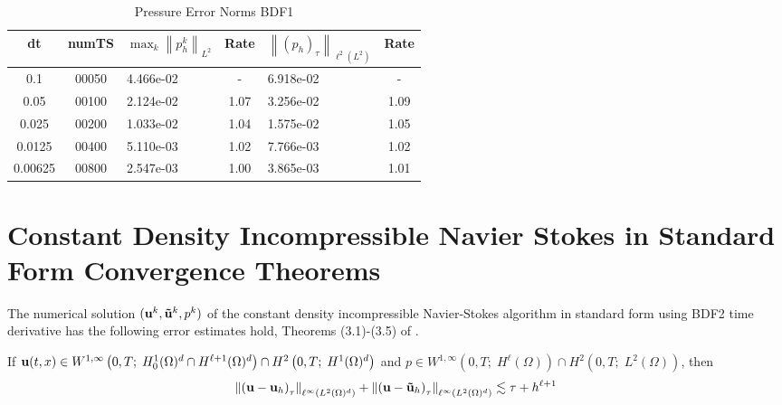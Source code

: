 \documentclass[letterpaper]{erdc}
\begin{document}
\begin{table}[h!]
  \begin{center}
    \caption{Pressure Error Norms BDF1}
    \begin{tabular}{c|c|l|c|l|c}
      dt & numTS &  $\displaystyle\max_{k} \left\|p^{k}_{h}\right\|_{L^2}$ &  Rate  &  $\left\|\left(p_h\right)_{\tau}\right\|_{\ell^2(L^2)}$  &  Rate\\
      \hline
      0.1     & 00050 & 4.466e-02 &   -  & 6.918e-02 &   - \\
      0.05    & 00100 & 2.124e-02 & 1.07 & 3.256e-02 & 1.09\\
      0.025   & 00200 & 1.033e-02 & 1.04 & 1.575e-02 & 1.05\\
      0.0125  & 00400 & 5.110e-03 & 1.02 & 7.766e-03 & 1.02\\
      0.00625 & 00800 & 2.547e-03 & 1.00 & 3.865e-03 & 1.01
    \end{tabular}
  \end{center}
\end{table}





\section{Constant Density Incompressible Navier Stokes in Standard Form Convergence Theorems}

The numerical solution $(\textbf{u}^k, \mathbf{\tilde{u}}^k,p^k)$ of the constant density incompressible Navier-Stokes algorithm in standard form using BDF2 time derivative has the following error estimates hold, Theorems (3.1)-(3.5) of \cite{guermond1997resultat}.

\begin{theorem}\label{thm:guermondthm3.1}
If $\textbf{u}(t,x)\in W^{1,\infty}\left(0,T;\; H_0^1(\Omega)^d \cap H^{\ell+1}(\Omega)^d  \right) \cap H^2\left(0,T;\; H^1(\Omega)^d\right)$ and $p\in W^{1,\infty}\left(0,T;\; H^{\ell}(\Omega) \right)\cap H^2\left(0,T;\; L^2(\Omega)\right)$, then
  \begin{equation}
    \left\| \left(\textbf{u} - \textbf{u}_h \right)_{\tau} \right\|_{\ell^{\infty}\left(L^2(\Omega)^d\right)} + \left\| \left(\textbf{u} - \mathbf{\tilde{u}}_h \right)_{\tau} \right\|_{\ell^{\infty}\left(L^2(\Omega)^d\right)} \lesssim \tau + h^{\ell+1}
  \end{equation}
\end{theorem}
\end{document}
